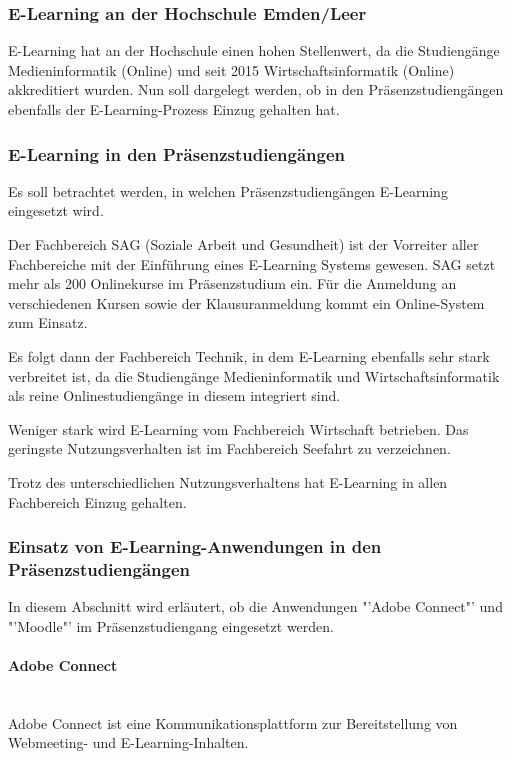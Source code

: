 \subsubsection{E-Learning an der Hochschule Emden/Leer}
E-Learning hat an der Hochschule einen hohen Stellenwert, da die Studiengänge Medieninformatik (Online) und seit 2015 Wirtschaftsinformatik (Online) akkreditiert  wurden. Nun soll dargelegt werden, ob in den Präsenzstudiengängen ebenfalls der E-Learning-Prozess Einzug gehalten hat.

\subsubsection{E-Learning in den Präsenzstudiengängen}
Es soll betrachtet werden, in welchen Präsenzstudiengängen E-Learning eingesetzt wird.

Der Fachbereich SAG (Soziale Arbeit und Gesundheit) ist der Vorreiter aller Fachbereiche mit der Einführung eines E-Learning Systems gewesen. SAG setzt mehr als 200 Onlinekurse im Präsenzstudium ein. Für die Anmeldung an verschiedenen Kursen sowie der Klausuranmeldung kommt ein Online-System zum Einsatz.

Es folgt dann der Fachbereich Technik, in dem E-Learning ebenfalls sehr stark verbreitet ist, da die Studiengänge Medieninformatik und Wirtschaftsinformatik als reine Onlinestudiengänge in diesem integriert sind.

Weniger stark wird E-Learning vom Fachbereich Wirtschaft betrieben. Das geringste Nutzungsverhalten ist im Fachbereich Seefahrt zu verzeichnen.

Trotz des unterschiedlichen Nutzungsverhaltens hat E-Learning in allen Fachbereich Einzug gehalten.

\subsubsection[Einsatz von E-Learning-Anwendungen]{Einsatz von E-Learning-Anwendungen in den Präsenzstudiengängen}
In diesem Abschnitt wird erläutert, ob die Anwendungen "'Adobe Connect"' und "'Moodle"' im Präsenzstudiengang eingesetzt werden.

\paragraph{Adobe Connect}\mbox{} \\

Adobe Connect ist eine Kommunikationsplattform zur Bereitstellung von Webmeeting- und E-Learning-Inhalten.

